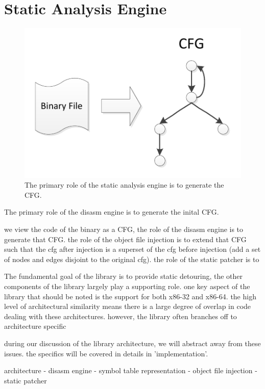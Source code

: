 \section{Static Analysis Engine}

\begin{figure}[H]
 \centering
 \includegraphics{Static_Analysis_Engine.pdf}
 \caption[Static Analysis Engine]{The primary role of the static analysis engine is to generate the CFG.}
\end{figure}

The primary role of the disasm engine is to generate the inital CFG. 

 we view the code of the binary as a CFG, the role of the disasm engine is to generate that CFG. the role of the object file injection is to extend that CFG such that the cfg after injection is a superset of the cfg before injection (add a set of nodes and edges disjoint to the original cfg). the role of the static patcher is to 

 The fundamental goal of the library is to provide static detouring, the other components of the library largely play a supporting role. one key aspect of the library that should be noted is the support for both x86-32 and x86-64. the high level of architectural similarity means there is a large degree of overlap in code dealing with these architectures. however, the library often branches off to architecture specific 

during our discussion of the library architecture, we will abstract away from these issues. the specifics will be covered in details in 'implementation'.

architecture
- disasm engine
  - symbol table representation
- object file injection
- static patcher

